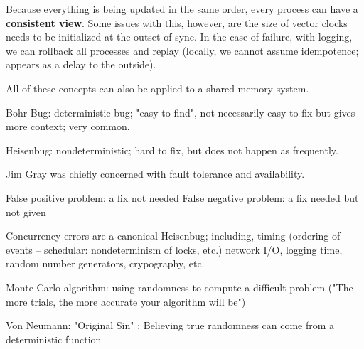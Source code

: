 \documentclass[twoside]{article}
\begin{document}

Because everything is being updated in the same order, every process can have a \textbf{consistent view}. Some issues with this, however, are the size of vector clocks needs to be initialized at the outset of sync. In the case of failure, with logging, we can rollback all processes and replay (locally, we cannot assume idempotence; appears as a delay to the outside).

All of these concepts can also be applied to a shared memory system.

Bohr Bug: deterministic bug; "easy to find", not necessarily easy to fix but gives more context; very common.

Heisenbug: nondeterministic; hard to fix, but does not happen as frequently.

Jim Gray was chiefly concerned with fault tolerance and availability.

False positive problem: a fix not needed
False negative problem: a fix needed but not given

Concurrency errors are a canonical Heisenbug; including, timing (ordering of events -- schedular: nondeterminism of locks, etc.) network I/O, logging time, random number generators, crypography, etc.

Monte Carlo algorithm: using randomness to compute a difficult problem ("The more trials, the more accurate your algorithm will be")

Von Neumann: "Original Sin" : Believing true randomness can come from a deterministic function
\end{document}
